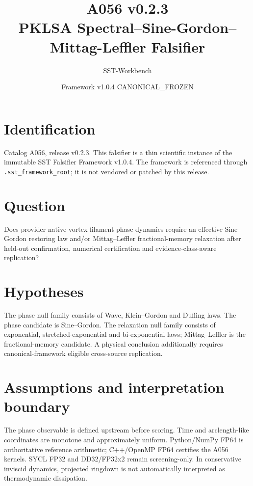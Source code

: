 \documentclass[11pt,a4paper]{article}
\title{A056 v0.2.3\\PKLSA Spectral--Sine-Gordon--Mittag-Leffler Falsifier}
\author{SST-Workbench}
\date{Framework v1.0.4 CANONICAL\_FROZEN}
\newcommand{\code}[1]{\texttt{#1}}
\begin{document}
\maketitle

\section{Identification}
Catalog A056, release v0.2.3. This falsifier is a thin scientific instance of the immutable SST Falsifier Framework v1.0.4. The framework is referenced through \code{.sst\_framework\_root}; it is not vendored or patched by this release.

\section{Question}
Does provider-native vortex-filament phase dynamics require an effective Sine--Gordon restoring law and/or Mittag--Leffler fractional-memory relaxation after held-out confirmation, numerical certification and evidence-class-aware replication?

\section{Hypotheses}
The phase null family consists of Wave, Klein--Gordon and Duffing laws. The phase candidate is Sine--Gordon. The relaxation null family consists of exponential, stretched-exponential and bi-exponential laws; Mittag--Leffler is the fractional-memory candidate. A physical conclusion additionally requires canonical-framework eligible cross-source replication.

\section{Assumptions and interpretation boundary}
The phase observable is defined upstream before scoring. Time and arclength-like coordinates are monotone and approximately uniform. Python/NumPy FP64 is authoritative reference arithmetic; C++/OpenMP FP64 certifies the A056 kernels. SYCL FP32 and DD32/FP32x2 remain screening-only. In conservative inviscid dynamics, projected ringdown is not automatically interpreted as thermodynamic dissipation.

\end{document}

